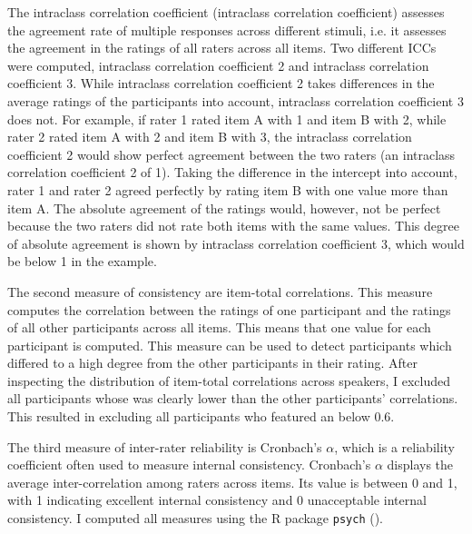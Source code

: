 The intraclass correlation coefficient (intraclass correlation coefficient) assesses the agreement rate of multiple responses across different stimuli, i.e. it assesses the agreement in the ratings of all raters across all items. Two different ICCs were computed, intraclass correlation coefficient 2 and intraclass correlation coefficient 3. While intraclass correlation coefficient 2 takes differences in the average ratings of the participants into account, intraclass correlation coefficient 3 does not. For example, if rater 1 rated item A with 1 and item B with 2, while rater 2 rated item A with 2 and item B with 3, the intraclass correlation coefficient 2 would show perfect agreement between the two raters (an intraclass correlation coefficient 2 of 1). Taking the difference in the intercept into account, rater 1 and rater 2 agreed perfectly by rating item B with one value more than item A. The absolute agreement of the ratings would, however, not be perfect because the two raters did not rate both items with the same values. This degree of absolute agreement is shown by intraclass correlation coefficient 3, which would be below 1 in the example.

The second measure of consistency are item-total correlations. This measure computes the correlation between the ratings of one participant and the ratings of all other participants across all items. This means that one value for each participant is computed. This measure can be used to detect participants which differed to a high degree from the other participants in their rating. After inspecting the distribution of item-total correlations across speakers, I excluded all participants whose  was clearly lower than the other participants' correlations. This resulted in excluding all participants who featured an  below 0.6. 

The third measure of inter-rater reliability is Cronbach's $\alpha$, which is a reliability coefficient often used to measure internal consistency. Cronbach's $\alpha$ displays the average inter-correlation among raters across items. Its value is between 0 and 1, with 1 indicating excellent internal consistency and 0 unacceptable internal consistency. 
I computed all measures using the R package \texttt{psych} (\citealt{Revelle.2017}).




